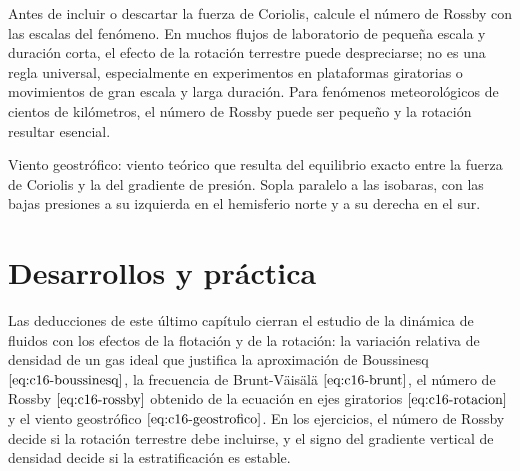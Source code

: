 \documentclass[10pt,openany]{book}
\begin{document}
\begin{tcolorbox}[title={Consejo}, studiumtip, breakable]

Antes de incluir o descartar la fuerza de Coriolis, calcule el número de Rossby con las escalas del fenómeno. En muchos flujos de laboratorio de pequeña escala y duración corta, el efecto de la rotación terrestre puede despreciarse; no es una regla universal, especialmente en experimentos en plataformas giratorias o movimientos de gran escala y larga duración. Para fenómenos meteorológicos de cientos de kilómetros, el número de Rossby puede ser pequeño y la rotación resultar esencial.
\end{tcolorbox}

\begin{tcolorbox}[title={Definición}, studiumdef, breakable]

Viento geostrófico: viento teórico que resulta del equilibrio exacto entre la fuerza de Coriolis y la del gradiente de presión. Sopla paralelo a las isobaras, con las bajas presiones a su izquierda en el hemisferio norte y a su derecha en el sur.
\end{tcolorbox}



\section{Desarrollos y práctica}

Las deducciones de este último capítulo cierran el estudio de la dinámica de fluidos con los efectos de la flotación y de la rotación: la variación relativa de densidad de un gas ideal que justifica la aproximación de Boussinesq \(\eqref{eq:c16-boussinesq}\), la frecuencia de Brunt-Väisälä \(\eqref{eq:c16-brunt}\), el número de Rossby \(\eqref{eq:c16-rossby}\) obtenido de la ecuación en ejes giratorios \(\eqref{eq:c16-rotacion}\) y el viento geostrófico \(\eqref{eq:c16-geostrofico}\). En los ejercicios, el número de Rossby decide si la rotación terrestre debe incluirse, y el signo del gradiente vertical de densidad decide si la estratificación es estable.
\end{document}
